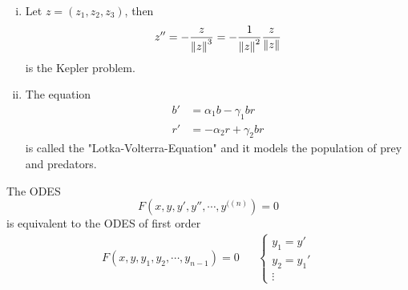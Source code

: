 \documentclass[../../script.tex]{subfiles}
\begin{document}
\begin{eg}
    \begin{enumerate}[(i)]
        \item Let $z = (z_1, z_2, z_3)$, then 
        \[
            z'' = -\frac{z}{\norm{z}^3} = -\frac{1}{\norm{z}^2} \frac{z}{\norm{z}}
        \]
        is the Kepler problem.

        \item The equation 
        \begin{align*}
            b' &= \alpha_1 b - \gamma_1 br \\
            r' &= -\alpha_2 r + \gamma_2 br 
        \end{align*}
        is called the "Lotka-Volterra-Equation" and it models the population of prey and predators.
    \end{enumerate}
\end{eg}

\begin{rem}
    The ODES 
    \[
        F(x, y, y', y'', \cdots, y^{((n)}) = 0
    \]
    is equivalent to the ODES of first order 
    \begin{align*}
        F(x, y, y_1, y_2, \cdots, y_{n-1}) = 0 && \begin{cases}
            y_1 = y' \\
            y_2 = y_1' \\
            \vdots
        \end{cases}
    \end{align*}
\end{rem}
\end{document}

